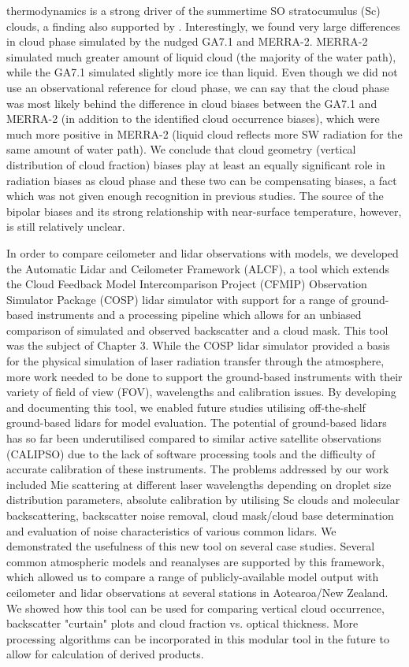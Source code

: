 thermodynamics is a strong driver of the summertime SO stratocumulus (Sc) clouds,
a finding also supported by \cite{hartery2020b}. Interestingly, we found
very large differences in cloud phase simulated by the nudged GA7.1 and MERRA-2.
MERRA-2 simulated much greater amount of liquid cloud (the majority of
the water path), while the GA7.1 simulated slightly more ice than liquid.
Even though we did not use an observational reference for cloud phase,
we can say that the cloud phase was most likely behind the difference in
cloud biases between the GA7.1 and MERRA-2 (in addition to the identified cloud occurrence biases), which were much more positive
in MERRA-2 (liquid cloud reflects more SW radiation for the same amount of water
path). We conclude that cloud geometry (vertical distribution of cloud fraction)
biases play at least an equally
significant role in radiation biases as cloud phase and these two can be
compensating biases, a fact which was not given enough recognition in previous
studies. The source of the bipolar biases and its strong relationship with
near-surface temperature, however, is still relatively unclear.

In order to compare ceilometer and lidar observations with models,
we developed the Automatic Lidar and Ceilometer Framework (ALCF),
a tool which extends the Cloud Feedback Model Intercomparison Project (CFMIP) Observation Simulator Package (COSP) lidar simulator with support for a range
of ground-based instruments and a processing pipeline which allows
for an unbiased comparison of simulated and observed backscatter and a cloud mask.
This tool was the subject of Chapter 3. While the COSP lidar simulator
provided a basis for the physical simulation of laser radiation transfer
through the atmosphere, more work needed to be done to support the ground-based
instruments with their variety of field of view (FOV), wavelengths and
calibration issues. By developing and documenting this tool, we enabled future
studies utilising off-the-shelf ground-based lidars for model evaluation.
The potential of ground-based lidars has so far been underutilised compared
to similar active satellite observations (CALIPSO) due to the
lack of software processing tools and the difficulty of accurate calibration
of these instruments. The problems addressed by our work included Mie
scattering at different laser wavelengths depending on droplet size distribution
parameters, absolute calibration by utilising Sc clouds and molecular
backscattering, backscatter noise removal, cloud mask/cloud base determination 
and evaluation of noise characteristics of various common lidars. We demonstrated
the
usefulness of this new tool on several case studies. Several common atmospheric
models and reanalyses are supported by this framework, which allowed us to compare
a range of publicly-available model output with ceilometer and lidar observations
at several stations in Aotearoa/New Zealand. We showed how this tool can be used
for comparing vertical cloud occurrence, backscatter "curtain" plots
and cloud fraction vs. optical thickness. More processing algorithms can
be incorporated in this modular tool in the future to allow for calculation of
derived products.


